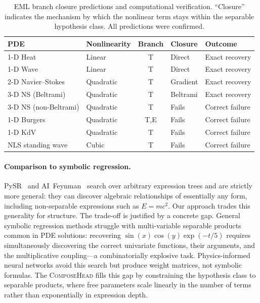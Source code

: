 \begin{table}[t]
  \centering
  \caption{EML branch closure predictions and computational verification.
    ``Closure'' indicates the mechanism by which the nonlinear term stays
    within the separable hypothesis class.  All predictions were confirmed.}
  \label{tab:branch}
  \smallskip
  \begin{tabular}{@{}llcll@{}}
    \toprule
    PDE & Nonlinearity & Branch & Closure & Outcome \\
    \midrule
    1-D Heat       & Linear    & T & Direct   & Exact recovery \\
    1-D Wave       & Linear    & T & Direct   & Exact recovery \\
    2-D Navier--Stokes & Quadratic & T & Gradient & Exact recovery \\
    3-D NS (Beltrami)  & Quadratic & T & Beltrami & Exact recovery \\
    \midrule
    3-D NS (non-Beltrami) & Quadratic & T & Fails & Correct failure \\
    1-D Burgers    & Quadratic & T,E & Fails  & Correct failure \\
    1-D KdV        & Quadratic & T & Fails    & Correct failure \\
    NLS standing wave & Cubic  & T & Fails    & Correct failure \\
    \bottomrule
  \end{tabular}
\end{table}

\paragraph{Comparison to symbolic regression.}
PySR~\cite{cranmer2023} and AI~Feynman~\cite{udrescu2020} search over arbitrary
expression trees and are strictly more general: they can discover algebraic
relationships of essentially any form, including non-separable expressions such
as $E = mc^{2}$.  Our approach trades this generality for structure.  The
trade-off is justified by a concrete gap.  General symbolic regression methods
struggle with multi-variable separable products common in PDE solutions:
recovering $\sin(x)\cos(y)\exp(-t/5)$ requires simultaneously discovering the
correct univariate functions, their arguments, and the multiplicative
coupling---a combinatorially explosive task.  Physics-informed neural networks
avoid this search but produce weight matrices, not symbolic formulas.  The
\textsc{ComposeHead} fills this gap by constraining the hypothesis class to
separable products, where free parameters scale linearly in the number of terms
rather than exponentially in expression depth.

